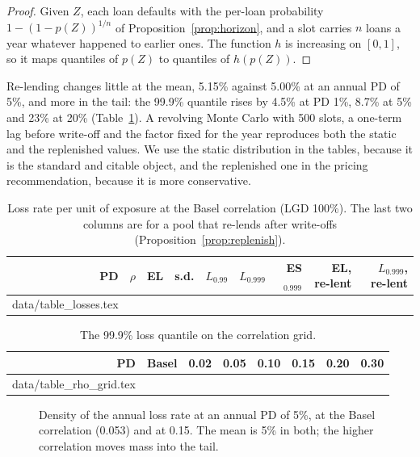 \documentclass[11pt]{article}
\makeatletter
\theoremstyle{plain}
\theoremstyle{definition}
\newcommand{\inputrows}[1]{\@@input #1 }
\makeatother
\begin{document}
\begin{proof}
Given $Z$, each loan defaults with the per-loan probability $1-(1-p(Z))^{1/n}$ of
Proposition~\ref{prop:horizon}, and a slot carries $n$ loans a year whatever happened to earlier
ones. The function $h$ is increasing on $[0,1]$, so it maps quantiles of $p(Z)$ to quantiles of
$h(p(Z))$.
\end{proof}

Re-lending changes little at the mean, 5.15\% against 5.00\% at an annual PD of 5\%, and more in the
tail: the 99.9\% quantile rises by 4.5\% at PD 1\%, 8.7\% at 5\% and 23\% at 20\%
(Table~\ref{tab:losses}). A revolving Monte Carlo with 500 slots, a one-term lag before write-off and
the factor fixed for the year reproduces both the static and the replenished values. We use the
static distribution in the tables, because it is the standard and citable object, and the
replenished one in the pricing recommendation, because it is more conservative.

\begin{table}[ht]
  \centering\small
  \caption{Loss rate per unit of exposure at the Basel correlation (LGD 100\%). The last two columns
  are for a pool that re-lends after write-offs (Proposition~\ref{prop:replenish}).}
  \label{tab:losses}
  \begin{tabular}{rrrrrrrrr}
    \toprule
    PD & $\rho$ & EL & s.d. & $L_{0.99}$ & $L_{0.999}$ & ES$_{0.999}$ & EL, re-lent & $L_{0.999}$, re-lent \\
    \midrule
    \inputrows{data/table_losses.tex}
    \bottomrule
  \end{tabular}
\end{table}

\begin{table}[ht]
  \centering\small
  \caption{The 99.9\% loss quantile on the correlation grid.}
  \label{tab:rhogrid}
  \begin{tabular}{rrrrrrrr}
    \toprule
    PD & Basel & 0.02 & 0.05 & 0.10 & 0.15 & 0.20 & 0.30 \\
    \midrule
    \inputrows{data/table_rho_grid.tex}
    \bottomrule
  \end{tabular}
\end{table}

\begin{figure}[ht]
  \centering
  
  \caption{Density of the annual loss rate at an annual PD of 5\%, at the Basel correlation (0.053)
  and at 0.15. The mean is 5\% in both; the higher correlation moves mass into the tail.}
  \label{fig:density}
\end{figure}
\end{document}
